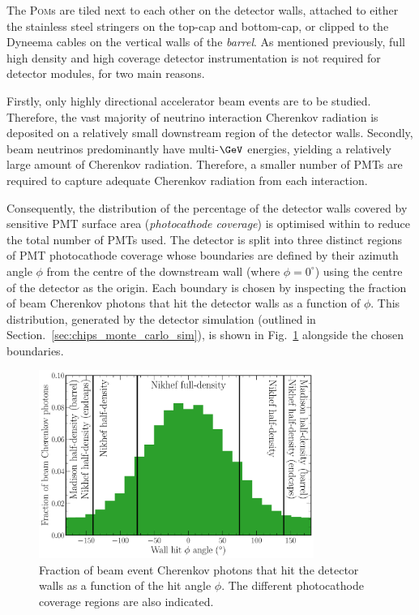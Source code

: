The \textsc{Pom}s are tiled next to each other on the detector walls, attached to either the
stainless steel stringers on the top-cap and bottom-cap, or clipped to the Dyneema cables on the
vertical walls of the \emph{barrel}. As mentioned previously, full high density and high coverage
detector instrumentation is not required for \chips detector modules, for two main reasons.

Firstly, only highly directional accelerator beam events are to be studied. Therefore, the vast
majority of neutrino interaction Cherenkov radiation is deposited on a relatively small downstream
region of the detector walls. Secondly, beam neutrinos predominantly have multi-$\GeV$ energies,
yielding a relatively large amount of Cherenkov radiation. Therefore, a smaller number of PMTs are
required to capture adequate Cherenkov radiation from each interaction.

Consequently, the distribution of the percentage of the detector walls covered by sensitive PMT
surface area (\emph{photocathode coverage}) is optimised within \chipsfive to reduce the total
number of PMTs used. The detector is split into three distinct regions of PMT photocathode
coverage whose boundaries are defined by their azimuth angle $\phi$ from the centre of the
downstream wall (where $\phi=0^{\circ}$) using the centre of the detector as the origin. Each
boundary is chosen by inspecting the fraction of beam Cherenkov photons that hit the detector
walls as a function of $\phi$. This distribution, generated by the detector simulation (outlined
in Section.~\ref{sec:chips_monte_carlo_sim}), is shown in Fig.~\ref{fig:coverage} alongside the
chosen boundaries.

\begin{figure} %
    \includegraphics[width=0.8\textwidth]{diagrams/4-chips/coverage.pdf}
    \caption[Fraction of beam event Cherenkov photons that hit the detector walls as a function of
        the hit angle] {Fraction of beam event Cherenkov photons that hit the detector walls as a
        function of the hit angle $\phi$. The different photocathode coverage regions are also
        indicated.}
    \label{fig:coverage}
\end{figure}

